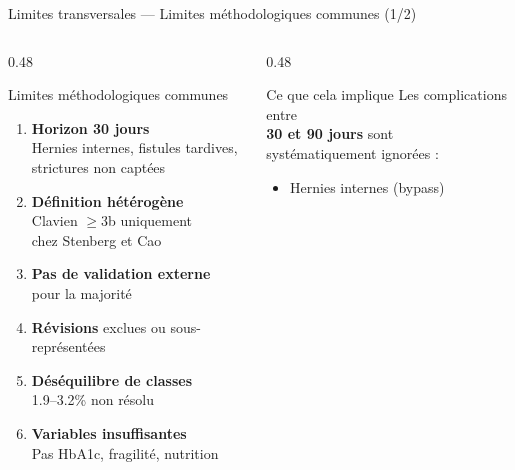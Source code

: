 \documentclass[aspectratio=169]{beamer}
\newcommand{\tightlist}{%
  \setlength{\itemsep}{1pt}\setlength{\parskip}{0pt}%
  \setlength{\parsep}{0pt}\setlength{\topsep}{2pt}}
\begin{document}
\begin{frame}{Limites transversales --- Limites méthodologiques communes (1/2)}
  \begin{columns}[T]
    \begin{column}{0.48\textwidth}
      \begin{alertblock}{Limites méthodologiques communes}
        \footnotesize
        \begin{enumerate}\tightlist
          \item \textbf{Horizon 30 jours}\\
                Hernies internes, fistules tardives,\\
                strictures non captées\\[4pt]
          \item \textbf{Définition hétérogène}\\
                Clavien $\geq$3b uniquement\\
                chez Stenberg et Cao\\[4pt]
          \item \textbf{Pas de validation externe}\\
                pour la majorité\\[4pt]
          \item \textbf{Révisions} exclues ou sous-représentées\\[4pt]
          \item \textbf{Déséquilibre de classes}\\
                1.9--3.2\% non résolu\\[4pt]
          \item \textbf{Variables insuffisantes}\\
                Pas HbA1c, fragilité, nutrition
        \end{enumerate}
      \end{alertblock}
    \end{column}
    \begin{column}{0.48\textwidth}
      \begin{block}{Ce que cela implique}
        \footnotesize
        Les complications entre\\
        \textbf{30 et 90 jours} sont\\
        systématiquement ignorées :\\[6pt]
        \begin{itemize}\tightlist
          \item Hernies internes (bypass)

\end{itemize}
\end{block}
\end{column}
\end{columns}
\end{frame}
\end{document}

